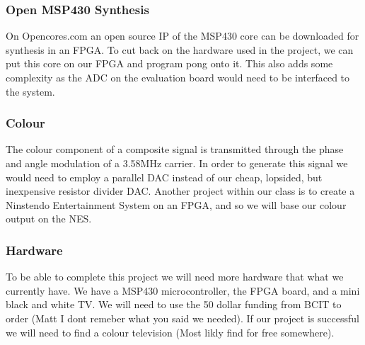 \subsubsection*{Open MSP430 Synthesis}

On Opencores.com an open source IP of the MSP430 core can be downloaded for
synthesis in an FPGA. To cut back on the hardware used in the project, we can
put this core on our FPGA and program pong onto it. This also adds some
complexity as the ADC on the evaluation board would need to be interfaced to the
system.

\subsubsection*{Colour}

The colour component of a composite signal is transmitted through the phase and
angle modulation of a 3.58MHz carrier. In order to generate this signal we would
need to employ a parallel DAC instead of our cheap, lopsided, but inexpensive
resistor divider DAC. Another project within our class is to create a Ninstendo
Entertainment System on an FPGA, and so we will base our colour output on the
NES.

\subsubsection*{Hardware}

To be able to complete this project we will need more hardware that what we 
currently have. We have a MSP430 microcontroller, the FPGA board, and a mini
black and white TV. We will need to use the 50 dollar funding from BCIT to order
(Matt I dont remeber what you said we needed). If our project is successful we 
will need to find a colour television (Most likly find for free somewhere).
